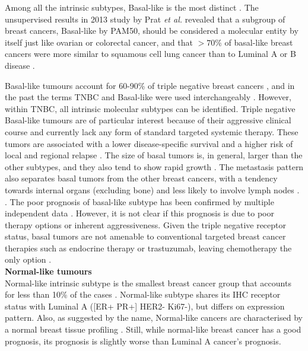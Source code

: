 Among all the intrinsic subtypes, Basal-like is the most distinct \cite{TCGAComprehensiveTumors}. The unsupervised results in 2013 study by Prat \textit{et al.} \cite{prat2013genomic}  revealed that a subgroup of breast cancers, Basal-like by PAM50, should be considered a molecular entity by itself just like ovarian or colorectal cancer, and that $>70\%$ of basal-like breast cancers were more similar to squamous cell lung cancer than to Luminal A or B disease \cite{prat2013genomic}. 

Basal-like tumours account for 60-90\% of triple negative breast cancers \cite{fan2006concordance}, and in the past the terms TNBC and Basal-like were used interchangeably \cite{Vidal2017}. However, within TNBC, all intrinsic molecular subtypes can be identified. 
Triple negative Basal-like tumours are of particular interest because of their aggressive clinical course and currently lack any form of standard targeted systemic therapy. These tumors are associated with a lower disease-specific survival and a higher risk of local and regional relapse \cite{hudis2011triple}. 
The size of basal tumors is, in general, larger than the other subtypes\cite{rakha2006morphological}, and they also tend to show rapid growth \cite{ho2012characterization}. The metastasis pattern also separates basal tumors from the other breast cancers, with a tendency towards internal organs (excluding bone) and less likely to involve lymph nodes \cite{ho2012characterization}. 
.
The poor prognosis of basal-like subtype  has been confirmed by multiple independent data \cite{brenton2005molecular}. However, it is not clear if this prognosis is due to poor therapy options or inherent aggressiveness. Given the triple negative receptor status,  basal tumors are not amenable to conventional targeted breast cancer therapies such as endocrine therapy or trastuzumab, leaving chemotherapy the only option \cite{brenton2005molecular, Dai2015}. \\


\textbf{Normal-like tumours }\\
Normal-like intrinsic subtype is the smallest breast cancer group that accounts for less than 10\% of the cases \cite{Dai2015}. Normal-like subtype shares its IHC receptor status with Luminal A ([ER+ PR+] HER2- Ki67-), but differs on expression pattern. Also, as suggested by the name, Normal-like cancers are characterised by a normal breast tissue profiling \cite{perou2000molecular}. Still, while normal-like breast cancer has a good prognosis, its prognosis is slightly worse than Luminal A cancer’s prognosis.\\





